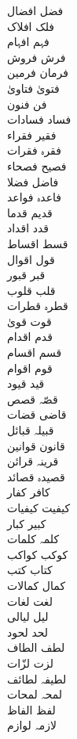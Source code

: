 \documentclass[a4paper]{article}
\begin{document}
\begin{multicols}{3}
\begin{tabbing}
فضل \> افضال\\
فلک \> افلاک\\
فہم \> افہام\\
فرش \> فروش\\
فرمان \> فرمین\\
فتویٰ \> فتاویٰ\\
فن \> فنون\\
فساد \> فسادات\\
فقیر \> فقراء\\
فقرہ \> فقرات\\
فصیح \> فصحاء\\
فاضل \> فضلا\\
فاعدہ \> فواعد\\
قدیم \> قدما\\
قدد \> اقداد\\
قسط \> اقساط\\
قول \> اقوال\\
قبر \> قبور\\
قلب \> قلوب\\
قطرہ \> قطرات\\
قوت \> قویٰ\\
قدم \> اقدام\\
قسم \> اقسام\\
قوم \> اقوام\\
قید \> قیود\\
قصّہ \> قصص\\
قاضی \> قضات\\
قبیلہ \> قبائل\\
قانون \> قوانین\\
قرینہ \> قرائن\\
قصیدہ \> قصائد\\
کافر \> کفار\\
کیفیت \> کیفیات\\
کبیر \> کبار\\
کلمہ \> کلمات\\
کوکب \> کواکب\\
کتاب \> کتب\\
کمال \> کمالات\\
لغت \> لغات\\
لیل \> لیالی\\
لحد \> لحود\\
لطف \> الطاف\\
لزت \> لزّات\\
لطیفہ \> لطائف\\
لمحہ \> لمحات\\
لفظ \> الفاظ\\
لازمہ \> لوازم\\

\end{tabbing}
\end{multicols}
\end{document}
